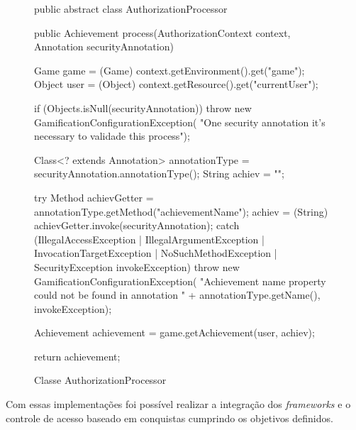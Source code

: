 \begin{figure}[H]
    \centering
    \caption{Classe AuthorizationProcessor}
    \begin{java}
public abstract class AuthorizationProcessor {

	public Achievement process(AuthorizationContext context, Annotation securityAnnotation) {
		
		Game game = (Game) context.getEnvironment().get("game");
		Object user = (Object) context.getResource().get("currentUser");

		if (Objects.isNull(securityAnnotation))
			throw new GamificationConfigurationException(
					"One security annotation it's necessary to validade this process");

		Class<? extends Annotation> annotationType = securityAnnotation.annotationType();
		String achiev = "";

		try {
			Method achievGetter = annotationType.getMethod("achievementName");
			achiev = (String) achievGetter.invoke(securityAnnotation);
		} catch (IllegalAccessException | IllegalArgumentException | InvocationTargetException | NoSuchMethodException
				| SecurityException invokeException) {
			throw new GamificationConfigurationException(
					"Achievement name property could not be found in annotation " + annotationType.getName(),
					invokeException);
		}

		Achievement achievement = game.getAchievement(user, achiev);

		return achievement;
	}
}
    \end{java}
    \label{fig:authorization-processor}
\end{figure}

\par Com essas implementações foi possível realizar a integração dos \textit{frameworks} e o controle de acesso baseado em conquistas cumprindo os objetivos definidos.